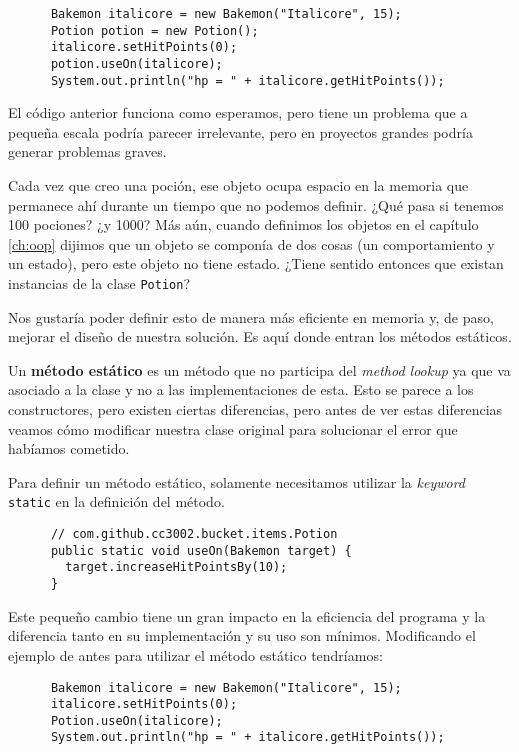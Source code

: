     \begin{verbatim}
      Bakemon italicore = new Bakemon("Italicore", 15);
      Potion potion = new Potion();
      italicore.setHitPoints(0);
      potion.useOn(italicore);
      System.out.println("hp = " + italicore.getHitPoints());
    \end{verbatim}

    El código anterior funciona como esperamos, pero tiene un problema que a pequeña escala podría 
    parecer irrelevante, pero en proyectos grandes podría generar problemas graves.

    Cada vez que creo una poción, ese objeto ocupa espacio en la memoria que permanece ahí durante un 
    tiempo que no podemos definir.
    ¿Qué pasa si tenemos 100 pociones? ¿y 1000?
    Más aún, cuando definimos los objetos en el capítulo \ref{ch:oop} dijimos que un objeto se 
    componía de dos cosas (un comportamiento y un estado), pero este objeto no tiene estado.
    ¿Tiene sentido entonces que existan instancias de la clase \texttt{Potion}?

    Nos gustaría poder definir esto de manera más eficiente en memoria y, de paso, mejorar el diseño 
    de nuestra solución.
    Es aquí donde entran los métodos estáticos.

    Un \textbf{método estático} es un método que no participa del \textit{method lookup} ya que va 
    asociado a la clase y no a las implementaciones de esta.
    Esto se parece a los constructores, pero existen ciertas diferencias, pero antes de ver estas 
    diferencias veamos cómo modificar nuestra clase original para solucionar el error que habíamos 
    cometido.

    Para definir un método estático, solamente necesitamos utilizar la \textit{keyword} 
    \texttt{static} en la definición del método.

    \begin{verbatim}
      // com.github.cc3002.bucket.items.Potion
      public static void useOn(Bakemon target) {
        target.increaseHitPointsBy(10);
      }
    \end{verbatim}

    Este pequeño cambio tiene un gran impacto en la eficiencia del programa y la diferencia tanto en
    su implementación y su uso son mínimos.
    Modificando el ejemplo de antes para utilizar el método estático tendríamos:
    \begin{verbatim}
      Bakemon italicore = new Bakemon("Italicore", 15);
      italicore.setHitPoints(0);
      Potion.useOn(italicore);
      System.out.println("hp = " + italicore.getHitPoints());
    \end{verbatim}

